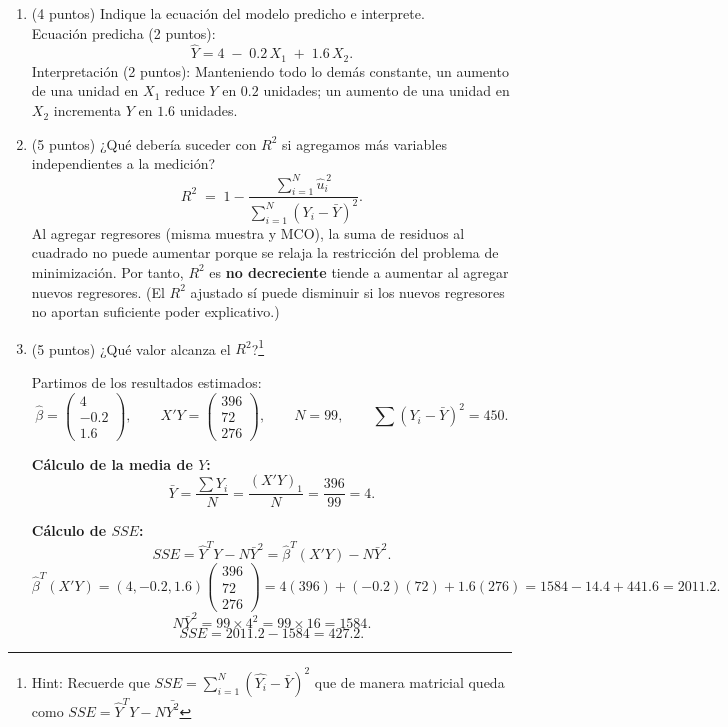 \documentclass[10pt,a4paper]{article}
\begin{document}
\begin{enumerate}
\begin{enumerate}
    \item (4 puntos) Indique la ecuación del modelo predicho e interprete.\\

    {\color{blue}
    Ecuación predicha (2 puntos):
    \[
    \hat{Y} = 4 \;-\; 0.2\,X_1 \;+\; 1.6\,X_2.
    \]
    Interpretación (2 puntos): Manteniendo todo lo demás constante, un aumento de una unidad en $X_1$ reduce $Y$ en $0.2$ unidades; un aumento de una unidad en $X_2$ incrementa $Y$ en $1.6$ unidades.
    }\\[0.25em]
    
    \item (5 puntos) ¿Qué debería suceder con $R^2$ si agregamos más variables independientes a la medición?\\

    {\color{blue}
    \[
    R^2 \;=\; 1 - \frac{\sum_{i=1}^N \hat{u}_i^{\,2}}{\sum_{i=1}^N (Y_i-\bar{Y})^2}.
    \]
    Al agregar regresores (misma muestra y MCO), la suma de residuos al cuadrado no puede aumentar porque se relaja la restricción del problema de minimización. Por tanto, $R^2$ es \textbf{no decreciente} tiende a aumentar al agregar nuevos regresores. (El $R^2$ ajustado sí puede disminuir si los nuevos regresores no aportan suficiente poder explicativo.)
    }

    \item (5 puntos) ¿Qué valor alcanza el $R^2$?\footnote{Hint: Recuerde que $SSE = \sum_{i=1}^N (\hat{Y_i} - \bar{Y})^2$ que de manera matricial queda como $SSE=\hat{Y}^T Y - N \bar{Y^2}$}\\

    {\color{blue}
    Partimos de los resultados estimados:
    \[
    \hat{\beta} =
    \begin{pmatrix}
    4\\
    -0.2\\
    1.6
    \end{pmatrix}, \qquad
    X'Y =
    \begin{pmatrix}
    396\\
    72\\
    276
    \end{pmatrix}, \qquad
    N = 99, \qquad
    \sum (Y_i - \bar{Y})^2 = 450.
    \]
    
    \textbf{Cálculo de la media de $Y$:}
    \[
    \bar{Y} = \frac{\sum Y_i}{N} = \frac{(X'Y)_1}{N} = \frac{396}{99} = 4.
    \]
    
    \textbf{Cálculo de $SSE$:}
    \[
    SSE = \hat{Y}^T Y - N \bar{Y}^2 = \hat{\beta}^T (X'Y) - N \bar{Y}^2.
    \]
    \[
    \hat{\beta}^T (X'Y) = (4, -0.2, 1.6)
    \begin{pmatrix}
    396\\
    72\\
    276
    \end{pmatrix}
    = 4(396) + (-0.2)(72) + 1.6(276)
    = 1584 - 14.4 + 441.6 = 2011.2.
    \]
    \[
    N \bar{Y}^2 = 99 \times 4^2 = 99 \times 16 = 1584.
    \]
    \[
    SSE = 2011.2 - 1584 = 427.2.
    \]
    
}
\end{enumerate}
\end{enumerate}
\end{document}
